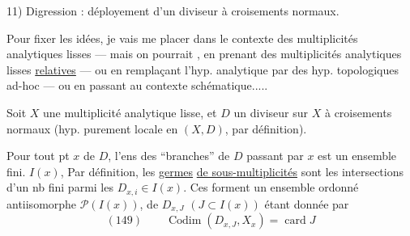 11) Digression : déployement d'un diviseur à croisements normaux.

Pour fixer les idées, je vais me placer dans le contexte des multiplicités analytiques lisses — mais on pourrait , en prenant des multiplicités analytiques lisses \uline{relatives} — ou en remplaçant l'hyp. analytique par des hyp. topologiques ad-hoc — ou en passant au contexte schématique.....

Soit $X$ une multiplicité analytique lisse, et $D$ un diviseur sur $X$ à croisements normaux (hyp. purement locale en $(X,D)$, par définition). 

Pour tout pt $x$ de $D$, l'ens des ``branches'' de $D$ passant par $x$ est un ensemble fini. $I(x)$, Par définition, les \uline{germes}  \uline{de sous-multiplicités}   sont les intersections d'un nb fini  parmi les $D_{x,i}\in I(x)$.
Ces  forment un ensemble ordonné  antiisomorphe  $\mathcal P(I(x))$,   de $D_{x,J}$ $(J\subset I(x))$ étant donnée par
\[
(149)\qquad \operatorname{Codim}(D_{x,J},X_x)=\operatorname{card}J
\]
